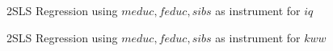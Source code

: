 2SLS Regression using $meduc, feduc, sibs$ as instrument for $iq$
\begin{stlog}\end{stlog}
2SLS Regression using $meduc, feduc, sibs$ as instrument for $kww$
\begin{stlog}\end{stlog}
